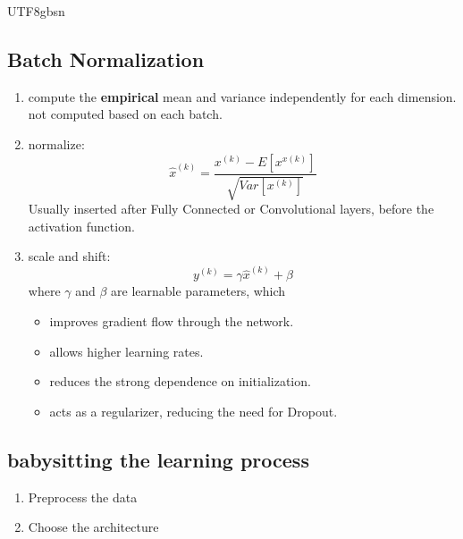 \documentclass{article}
\numberwithin{equation}{section}
\begin{document}
\begin{CJK}{UTF8}{gbsn}
\subsection{Batch Normalization}\par
\begin{enumerate}
    \item compute the \textbf{empirical} mean and variance independently for each dimension. not computed based on each batch.\par
    \item normalize: 
    \begin{equation}
        \hat{x}^{(k)} = \frac{x^{(k)} - E[x^{x(k)}]}{\sqrt{Var[x^{(k)}]}}
    \end{equation}
    Usually inserted after Fully Connected or Convolutional layers, before the activation function.\par
    \item scale and shift:
    \begin{equation}
        y^{(k)} = \gamma \hat{x}^{(k)} + \beta
    \end{equation}
    where \(\gamma\) and \(\beta\) are learnable parameters, which
    \begin{itemize}
        \item improves gradient flow through the network.\par
        \item allows higher learning rates.\par
        \item reduces the strong dependence on initialization.\par
        \item acts as a regularizer, reducing the need for Dropout.\par
    \end{itemize}
\end{enumerate}

\subsection{babysitting the learning process}\par
\begin{enumerate}
    \item Preprocess the data\par
    \item Choose the architecture\par
\end{enumerate}


\end{CJK}
\end{document}
